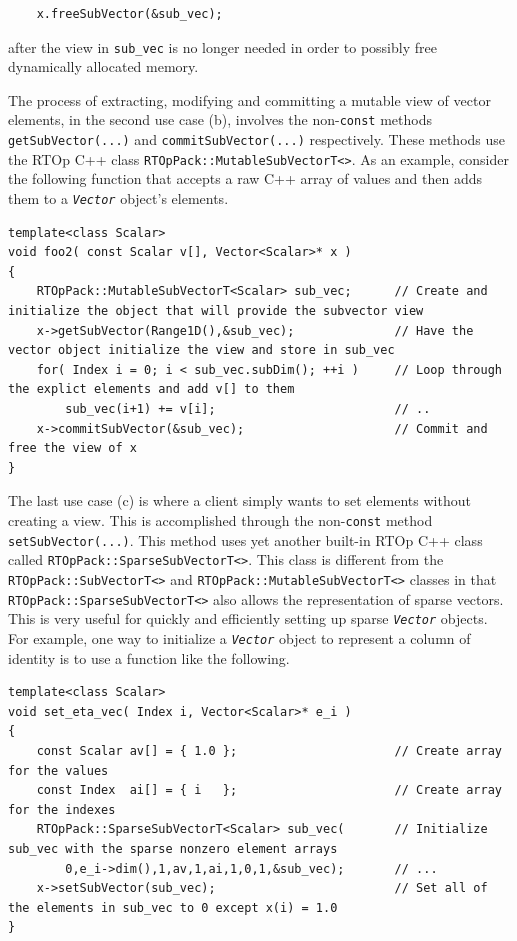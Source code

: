 {\tiny\begin{verbatim}
    x.freeSubVector(&sub_vec);
\end{verbatim}}

after the view in \texttt{sub\_vec} is no longer needed in order to possibly
free dynamically allocated memory.

The process of extracting, modifying and committing a mutable view of
vector elements, in the second use case (b), involves the
non-\texttt{const} methods \texttt{getSubVector(...)} and
\texttt{commit\-Sub\-Vector(...)} respectively.  These methods use the
RTOp C++ class \texttt{RTOpPack::\-Mutable\-Sub\-VectorT<>}.  As an
example, consider the following function that accepts a raw C++ array
of values and then adds them to a \texttt{\textit{Vector}} object's
elements.

{\tiny\begin{verbatim}
template<class Scalar>
void foo2( const Scalar v[], Vector<Scalar>* x )
{
    RTOpPack::MutableSubVectorT<Scalar> sub_vec;      // Create and initialize the object that will provide the subvector view
    x->getSubVector(Range1D(),&sub_vec);              // Have the vector object initialize the view and store in sub_vec
    for( Index i = 0; i < sub_vec.subDim(); ++i )     // Loop through the explict elements and add v[] to them
        sub_vec(i+1) += v[i];                         // ..
    x->commitSubVector(&sub_vec);                     // Commit and free the view of x
}
\end{verbatim}}

The last use case (c) is where a client simply wants to set elements
without creating a view.  This is accomplished through the
non-\texttt{const} method \texttt{set\-Sub\-Vector(...)}.  This method
uses yet another built-in RTOp C++ class called
\texttt{RTOpPack::\-Sparse\-Sub\-VectorT<>}.  This class is different from the
\texttt{RTOpPack::\-SubVectorT<>} and
\texttt{RTOpPack::\-Mutable\-Sub\-VectorT<>} classes in that
\texttt{RTOpPack::\-Sparse\-Sub\-VectorT<>} also allows the representation of 
sparse vectors.  This is very useful for quickly and efficiently
setting up sparse \texttt{\textit{Vector}} objects.  For example, one
way to initialize a \texttt{\textit{Vector}} object to represent a
column of identity is to use a function like the following.

{\tiny\begin{verbatim}
template<class Scalar>
void set_eta_vec( Index i, Vector<Scalar>* e_i )
{
    const Scalar av[] = { 1.0 };                      // Create array for the values
    const Index  ai[] = { i   };                      // Create array for the indexes
    RTOpPack::SparseSubVectorT<Scalar> sub_vec(       // Initialize sub_vec with the sparse nonzero element arrays
        0,e_i->dim(),1,av,1,ai,1,0,1,&sub_vec);       // ...
    x->setSubVector(sub_vec);                         // Set all of the elements in sub_vec to 0 except x(i) = 1.0
}
\end{verbatim}}


